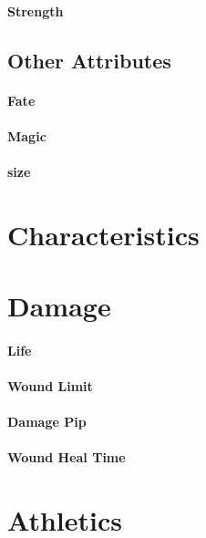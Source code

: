 \paragraph{Strength}

\subsection{Other Attributes}
\paragraph{Fate}
\paragraph{Magic}

\paragraph{size}

\section{Characteristics}

\section{Damage}

\paragraph{Life}

\paragraph{Wound Limit}

\paragraph{Damage Pip}

\paragraph{Wound Heal Time}

\section{Athletics}
